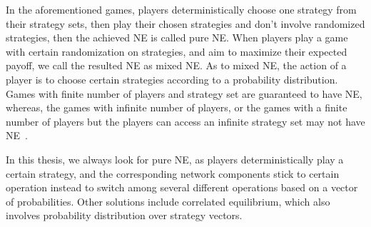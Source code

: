 




In the aforementioned games, players deterministically choose one strategy from their strategy sets, then play their chosen strategies and don't involve randomized strategies, then the achieved NE is called pure NE. 
When players play a game with certain randomization on strategies, and aim to maximize their expected payoff, we call the resulted NE as mixed NE.
As to mixed NE, the action of a player is to choose certain strategies according to a probability distribution.
Games with finite number of players and strategy set are guaranteed to have NE, whereas, the games with infinite number of players, or the games with a finite number of players but the players can access an infinite strategy set may not have NE~\cite{agt_book}.

In this thesis, we always look for pure NE, as players deterministically play a certain strategy, and the corresponding network components stick to certain operation instead to switch among several different operations based on a vector of probabilities.
Other solutions include correlated equilibrium, which also involves probability distribution over strategy vectors.



